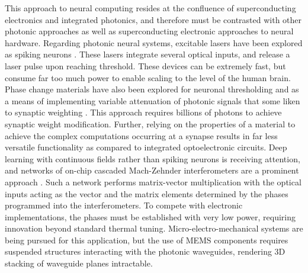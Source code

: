 \documentclass[twocolumn]{article}
\begin{document}
This approach to neural computing resides at the confluence of superconducting electronics and integrated photonics, and therefore must be contrasted with other photonic approaches as well as superconducting electronic approaches to neural hardware. Regarding photonic neural systems, excitable lasers have been explored as spiking neurons \cite{prsh2017}. These lasers integrate several optical inputs, and release a laser pulse upon reaching threshold. These devices can be extremely fast, but consume far too much power to enable scaling to the level of the human brain. Phase change materials have also been explored for neuronal thresholding \cite{chsa2018} and as a means of implementing variable attenuation of photonic signals that some liken to synaptic weighting \cite{chri2017}. This approach requires billions of photons to achieve synaptic weight modification. Further, relying on the properties of a material to achieve the complex computations occurring at a synapse results in far less versatile functionality as compared to integrated optoelectronic circuits. Deep learning with continuous fields rather than spiking neurons is receiving attention, and networks of on-chip cascaded Mach-Zehnder interferometers are a prominent approach \cite{shha2016}. Such a network performs matrix-vector multiplication with the optical inputs acting as the vector and the matrix elements determined by the phases programmed into the interferometers. To compete with electronic implementations, the phases must be established with very low power, requiring innovation beyond standard thermal tuning. Micro-electro-mechanical systems are being pursued for this application, but the use of MEMS components requires suspended structures interacting with the photonic waveguides, rendering 3D stacking of waveguide planes intractable. 
\end{document}
